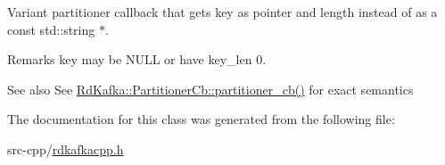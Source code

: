 Variant partitioner callback that gets {\ttfamily key} as pointer and length instead of as a const std::string $\ast$. \begin{DoxyRemark}{Remarks}
{\ttfamily key} may be NULL or have {\ttfamily key\_\-len} 0.
\end{DoxyRemark}
\begin{DoxySeeAlso}{See also}
See \hyperlink{classRdKafka_1_1PartitionerCb_a44c743f829a74fe7bca5a1e931a90f82}{RdKafka::PartitionerCb::partitioner\_\-cb()} for exact semantics 
\end{DoxySeeAlso}


The documentation for this class was generated from the following file:\begin{DoxyCompactItemize}
\item 
src-\/cpp/\hyperlink{rdkafkacpp_8h}{rdkafkacpp.h}\end{DoxyCompactItemize}
